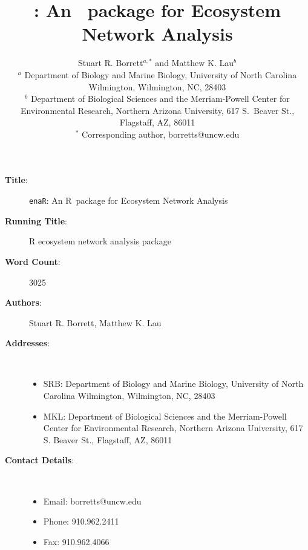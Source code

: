 \documentclass[11pt]{article}
\title{\enaR: An \R\ package for Ecosystem Network Analysis}
\author{Stuart R. Borrett$^{a,*}$ and Matthew K. Lau$^b$
  \\ {\footnotesize $^a$ Department of Biology and Marine Biology,
    University of North Carolina Wilmington, Wilmington, NC, 28403}
  \\ {\footnotesize $^b$ Department of Biological Sciences and the
    Merriam-Powell Center for Environmental Research, Northern Arizona
    University, 617 S.\ Beaver St., Flagstaff, AZ, 86011}
  \\ {\footnotesize $^*$ Corresponding author, borretts@uncw.edu} }
\newcommand{\R}{R}
\newcommand{\enaR}{\texttt{enaR}}
\begin{document}

\begin{description}
  \item[\textbf{Title}:] \enaR: An \R\ package for Ecosystem Network Analysis
  \item[\textbf{Running Title}:] R ecosystem network analysis package 
  \item[\textbf{Word Count}:] 3025
  \item[\textbf{Authors}:] Stuart R. Borrett, Matthew K. Lau
  \item[\textbf{Addresses}:] \
    \begin{itemize}
    \item SRB: Department of Biology and Marine Biology, University of
      North Carolina Wilmington, Wilmington, NC, 28403
    \item MKL: Department of Biological Sciences and the
      Merriam-Powell Center for Environmental Research, Northern
      Arizona University, 617 S. Beaver St., Flagstaff, AZ, 86011
    \end{itemize}
  \item[\textbf{Contact Details}:] \
    \begin{itemize}
    \item Email: borretts@uncw.edu
    \item Phone: 910.962.2411
    \item Fax: 910.962.4066
    \end{itemize}
\end{description}

\pagebreak

\maketitle
\end{document}
